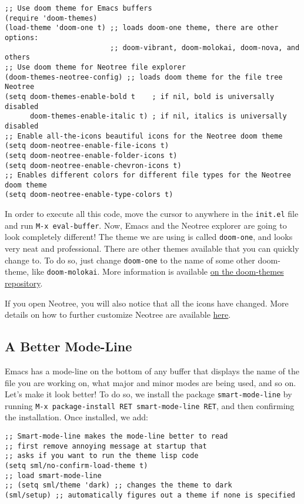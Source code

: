 \documentclass[12pt, a4paper]{article}
\begin{document}
\lstset{language=Lisp,label= ,caption= ,captionpos=b,numbers=none}
\begin{lstlisting}
;; Use doom theme for Emacs buffers
(require 'doom-themes)
(load-theme 'doom-one t) ;; loads doom-one theme, there are other options:
                         ;; doom-vibrant, doom-molokai, doom-nova, and others
;; Use doom theme for Neotree file explorer
(doom-themes-neotree-config) ;; loads doom theme for the file tree Neotree
(setq doom-themes-enable-bold t    ; if nil, bold is universally disabled
      doom-themes-enable-italic t) ; if nil, italics is universally disabled
;; Enable all-the-icons beautiful icons for the Neotree doom theme
(setq doom-neotree-enable-file-icons t)
(setq doom-neotree-enable-folder-icons t)
(setq doom-neotree-enable-chevron-icons t)
;; Enables different colors for different file types for the Neotree doom theme
(setq doom-neotree-enable-type-colors t)
\end{lstlisting}

In order to execute all this code, move the cursor to anywhere in the \texttt{init.el} file and run \texttt{M-x eval-buffer}. Now, Emacs and the Neotree explorer are going to look completely different! The theme we are using is called \texttt{doom-one}, and looks very neat and professional. There are other themes available that you can quickly change to. To do so, just change \texttt{doom-one} to the name of some other doom-theme, like \texttt{doom-molokai}. More information is available \href{https://github.com/hlissner/emacs-doom-themes}{on the doom-themes repository}.

If you open Neotree, you will also notice that all the icons have changed. More details on how to further customize Neotree are available \href{https://github.com/hlissner/emacs-doom-themes/wiki}{here}.

\subsection{A Better Mode-Line}
\label{sec:orga7da27d}

Emacs has a mode-line on the bottom of any buffer that displays the name of the file you are working on, what major and minor modes are being used, and so on. Let's make it look better! To do so, we install the package \texttt{smart-mode-line} by running \texttt{M-x package-install RET smart-mode-line RET}, and then confirming the installation. Once installed, we add:

\lstset{language=Lisp,label= ,caption= ,captionpos=b,numbers=none}
\begin{lstlisting}
;; Smart-mode-line makes the mode-line better to read
;; first remove annoying message at startup that
;; asks if you want to run the theme lisp code
(setq sml/no-confirm-load-theme t)
;; load smart-mode-line
;; (setq sml/theme 'dark) ;; changes the theme to dark
(sml/setup) ;; automatically figures out a theme if none is specified
\end{lstlisting}
\end{document}
